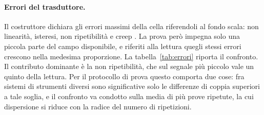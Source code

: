 \paragraph{Errori del trasduttore.}
Il costruttore dichiara gli errori massimi della cella riferendoli al fondo
scala: non linearità, isteresi, non ripetibilità e creep \cite{interface6a}. La
prova però impegna solo una piccola parte del campo disponibile, e riferiti alla
lettura quegli stessi errori crescono nella medesima proporzione. La
tabella~\ref{tab:errori} riporta il confronto. Il contributo dominante è la non
ripetibilità, che sul segnale più piccolo vale un quinto della lettura. Per il
protocollo di prova questo comporta due cose: fra sistemi di strumenti diversi
sono significative solo le differenze di coppia superiori a tale soglia, e il
confronto va condotto sulla media di più prove ripetute, la cui dispersione si
riduce con la radice del numero di ripetizioni.

